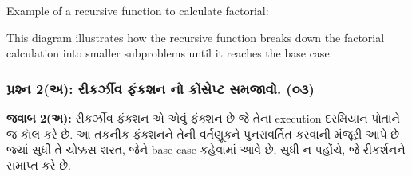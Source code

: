Example of a recursive function to calculate factorial:

\begin{Shaded}
\begin{Highlighting}[]
    \OperatorTok{==}  \OperatorTok{==} \NormalTok{:}
         
    \NormalTok{:}
        \OperatorTok{*}\OperatorTok{{-}} \NormalTok{)}

\NormalTok{))  }
\end{Highlighting}
\end{Shaded}

\begin{Shaded}
\begin{Highlighting}[]
\end{Highlighting}
\end{Shaded}

This diagram illustrates how the recursive function breaks down the
factorial calculation into smaller subproblems until it reaches the base
case.

\hypertarget{uxaaauxab0uxab6uxaa8-2uxa85-uxab0uxa95uxab0uxa9duxab5-uxaabuxa95uxab6uxaa8-uxaa8-uxa95uxab8uxaaauxa9f-uxab8uxaaeuxa9cuxab5.-uxae6uxae9}{%
\subsubsection{પ્રશ્ન 2(અ): રીકર્ઝીવ ફંકશન નો કોંસેપ્ટ સમજાવો.
(૦૩)}\label{uxaaauxab0uxab6uxaa8-2uxa85-uxab0uxa95uxab0uxa9duxab5-uxaabuxa95uxab6uxaa8-uxaa8-uxa95uxab8uxaaauxa9f-uxab8uxaaeuxa9cuxab5.-uxae6uxae9}}

\textbf{જવાબ 2(અ):} રીકર્ઝીવ ફંક્શન એ એવું ફંક્શન છે જે તેના execution દરમિયાન
પોતાને જ કૉલ કરે છે. આ તકનીક ફંક્શનને તેની વર્તણૂકને પુનરાવર્તિત કરવાની મંજૂરી આપે છે
જ્યાં સુધી તે ચોક્કસ શરત, જેને base case કહેવામાં આવે છે, સુધી ન પહોંચે, જે રીકર્શનને
સમાપ્ત કરે છે.

